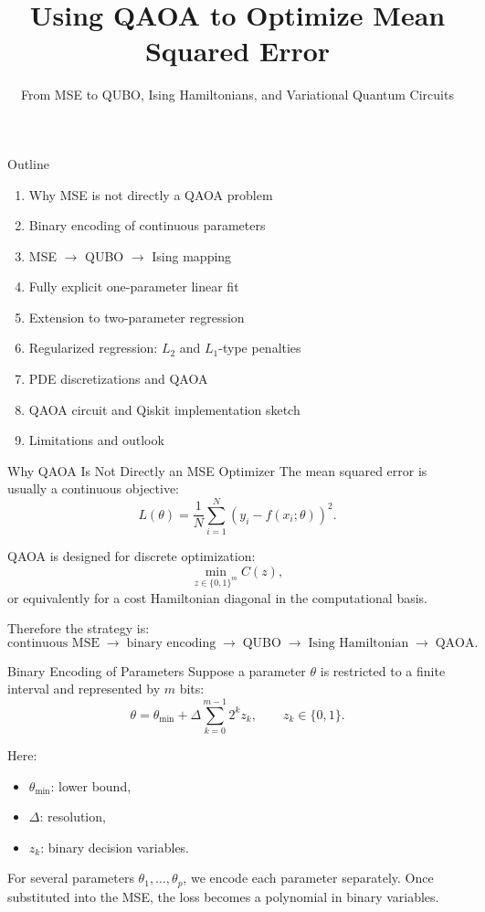 \documentclass{beamer}
\title{Using QAOA to Optimize Mean Squared Error}
\subtitle{From MSE to QUBO, Ising Hamiltonians, and Variational Quantum Circuits}
\author{}
\date{}
\begin{document}
\frame{\titlepage}

\begin{frame}{Outline}
\begin{enumerate}
\item Why MSE is not directly a QAOA problem
\item Binary encoding of continuous parameters
\item MSE \(\rightarrow\) QUBO \(\rightarrow\) Ising mapping
\item Fully explicit one-parameter linear fit
\item Extension to two-parameter regression
\item Regularized regression: \(L_2\) and \(L_1\)-type penalties
\item PDE discretizations and QAOA
\item QAOA circuit and Qiskit implementation sketch
\item Limitations and outlook
\end{enumerate}
\end{frame}

\begin{frame}{Why QAOA Is Not Directly an MSE Optimizer}
The mean squared error is usually a continuous objective:
\[
L(\theta)=\frac1N \sum_{i=1}^N \left(y_i-f(x_i;\theta)\right)^2.
\]

QAOA is designed for discrete optimization:
\[
\min_{z\in\{0,1\}^m} C(z),
\]
or equivalently for a cost Hamiltonian diagonal in the computational basis.

Therefore the strategy is:
\[
\text{continuous MSE}
\;\longrightarrow\;
\text{binary encoding}
\;\longrightarrow\;
\text{QUBO}
\;\longrightarrow\;
\text{Ising Hamiltonian}
\;\longrightarrow\;
\text{QAOA}.
\]
\end{frame}

\begin{frame}{Binary Encoding of Parameters}
Suppose a parameter \(\theta\) is restricted to a finite interval and represented by \(m\) bits:
\[
\theta = \theta_{\min} + \Delta \sum_{k=0}^{m-1} 2^k z_k,
\qquad z_k\in\{0,1\}.
\]

Here:
\begin{itemize}
\item \(\theta_{\min}\): lower bound,
\item \(\Delta\): resolution,
\item \(z_k\): binary decision variables.
\end{itemize}

For several parameters \(\theta_1,\dots,\theta_p\), we encode each parameter separately.
Once substituted into the MSE, the loss becomes a polynomial in binary variables.
\end{frame}
\end{document}

